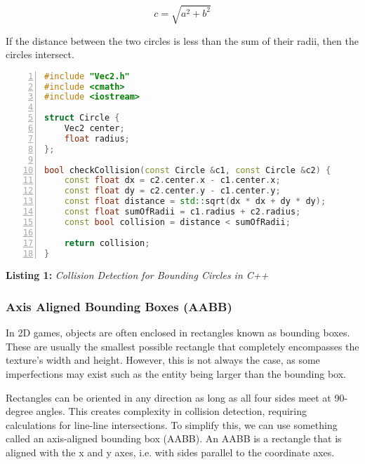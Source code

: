 \documentclass[10pt,a4paper]{article}
\begin{document}
\begin{equation}
    c = \sqrt{a^2 + b^2}
\end{equation}

If the distance between the two circles is less than the sum of their radii,
then the circles intersect.

\begin{mdframed}
    \vspace{1em}

    \begin{lstlisting}[language=C++, aboveskip=3mm,
        belowskip=3mm,
        showstringspaces=false,
        columns=flexible,
        basicstyle={\small\ttfamily},
        numbers=left,
        numberstyle=\tiny\color{gray},
        keywordstyle=\color{blue},
        commentstyle=\color{dkgreen},
        stringstyle=\color{mauve},
        breaklines=true,
        breakatwhitespace=true,
        tabsize=3,
        xleftmargin=1em]
#include "Vec2.h"
#include <cmath>
#include <iostream>

struct Circle {
    Vec2 center;
    float radius;
};

bool checkCollision(const Circle &c1, const Circle &c2) {
    const float dx = c2.center.x - c1.center.x;
    const float dy = c2.center.y - c1.center.y;
    const float distance = std::sqrt(dx * dx + dy * dy);
    const float sumOfRadii = c1.radius + c2.radius;
    const bool collision = distance < sumOfRadii;

    return collision;
}
\end{lstlisting}

\end{mdframed}

\begin{center}
    \textbf{Listing 1:} \textit{Collision Detection for Bounding Circles in C++}
\end{center}

\newpage

\subsubsection{Axis Aligned Bounding Boxes (AABB)}
In 2D games, objects are often enclosed in rectangles known as bounding boxes.
These are usually the smallest possible rectangle that completely encompasses
the texture's width and height. However, this is not always the case, as some
imperfections may exist such as the entity being larger than the bounding box.

Rectangles can be oriented in any direction as long as all four sides meet at
90-degree angles. This creates complexity in collision detection, requiring
calculations for line-line intersections. To simplify this, we can use
something called an axis-aligned bounding box (AABB). An AABB is a rectangle
that is aligned with the x and y axes, i.e. with sides parallel to the
coordinate axes.
\end{document}
